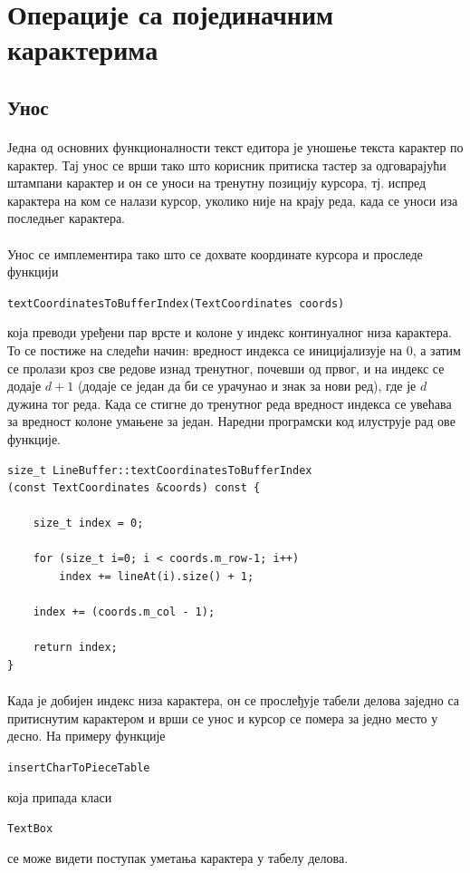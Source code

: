 \documentclass[12pt,oneside]{memoir}
\begin{document}
\section{Операције са појединачним карактерима}

\subsection{Унос}
\paragraph{}
Једна од основних функционалности текст едитора је уношење текста карактер
по карактер. Тај унос се врши тако што корисник притиска тастер за одговарајући
штампани карактер и он се уноси на тренутну позицију курсора, тј. испред карактера на ком се налази курсор, уколико није на крају реда, када се уноси иза последњег карактера. 

\paragraph{}
Унос се имплементира тако што се дохвате координате курсора и проследе функцији
\begin{latinica}\verb|textCoordinatesToBufferIndex(TextCoordinates coords)|\end{latinica} 
која преводи уређени пар врсте и колоне у индекс континуалног низа карактера. То се постиже на
следећи начин: вредност индекса се иницијализује на 0, а затим се пролази кроз све редове
изнад тренутног, почевши од првог, и на индекс се додаје \(d+1\) (додаје се један да би се урачунао и знак за нови ред), где је \(d\) дужина тог реда. 
Када се стигне до тренутног реда вредност индекса се увећава за вредност колоне умањене за
један. Наредни програмски код илуструје рад ове функције.

\begin{verbatim}
size_t LineBuffer::textCoordinatesToBufferIndex
(const TextCoordinates &coords) const {
		
	size_t index = 0;
	
	for (size_t i=0; i < coords.m_row-1; i++)
		index += lineAt(i).size() + 1;
	
	index += (coords.m_col - 1);
	
	return index;
}
\end{verbatim}

\paragraph{}
Када је добијен индекс низа карактера, он се прослеђује табели делова заједно са  притиснутим карактером и врши се унос и курсор се помера за једно место у десно. 
На примеру функције 
\begin{latinica}\verb|insertCharToPieceTable|\end{latinica} која припада класи
\begin{latinica}\verb|TextBox|\end{latinica} се може видети поступак уметања
карактера у табелу делова.
\end{document}
